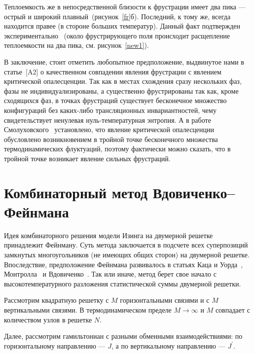 Теплоемкость же в непосредственной близости к фрустрации имеет два пика --- острый и широкий плавный~(рисунок~\ref{fr}б). Последний, к тому же, всегда находится правее (в стороне больших температур). Данный факт подтвержден экспериментально~\cite{matsumura1997} (около фрустрирующего поля происходит расщепление теплоемкости на два пика, см. рисунок~\ref{new1}). 

В заключение, стоит отметить любопытное предположение, выдвинутое нами в  статье~[A2] о качественном совпадении явления фрустрации с явлением критической опалесценции. Так как в местах схождения сразу нескольких фаз, фазы не индивидуализированы, а существенно фрустрированы так как, кроме сходящихся фаз, в точках фрустраций существует бесконечное множество конфигураций без каких-либо трансляционных инвариантностей, чему свидетельствует ненулевая нуль-температурная энтропия. А в работе Смолуховского~\cite{smoluchowski1907} установлено, что явление критической опалесценции обусловлено возникновением в тройной точке бесконечного множества термодинамических флуктуаций, поэтому фактически можно сказать, что в тройной точке возникает явление сильных фрустраций.


\section{Комбинаторный метод Вдовиченко--Фейнмана}\label{sec:markup}

Идея комбинаторного решения модели Изинга на двумерной решетке принадлежит Фейнману. Суть метода заключается в подсчете всех суперпозиций замкнутых многоугольников (не имеющих общих сторон) на двумерной решетке. Впоследствие, предположение Фейнмана развивалось в статьях Каца и Уорда~\cite{kac1952}, Монтролла~\cite{montroll1953} и Вдовиченко~\cite{vdovichenko1965}. Так или иначе, метод берет свое начало с высокотемпературного разложения статистической суммы двумерной решетки. 

Рассмотрим квадратную решетку с $M$ горизонтальными связями и с $M$ вертикальными связями. В термодинамическом пределе $M \rightarrow \infty$ и $M$ совпадает с количеством узлов в решетке $N$. 

Далее, рассмотрим гамильтониан с разными обменными взаимодействиями: по горизонтальному направлению --- $J$, а по вертикальному направлению --- $J^{'}$.

